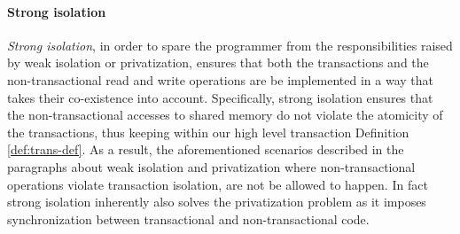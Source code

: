 








\paragraph{Strong isolation}

\emph{Strong isolation}, in order to spare the programmer from the responsibilities
raised by weak isolation or privatization, ensures that  
both the  transactions  and  the non-transactional
read and write operations are be implemented in a way  
that  takes their co-existence  into account.
Specifically, strong isolation ensures that the non-transactional accesses to shared memory
do not violate the atomicity of the transactions,
thus keeping within our high level transaction Definition \ref{def:trans-def}.
As a result,
the aforementioned scenarios described in the paragraphs about weak isolation
and privatization  where non-transactional operations  violate
transaction isolation, are not be allowed to happen.  
In fact strong isolation
inherently also solves the privatization problem as it
imposes synchronization between transactional and non-transactional code.

